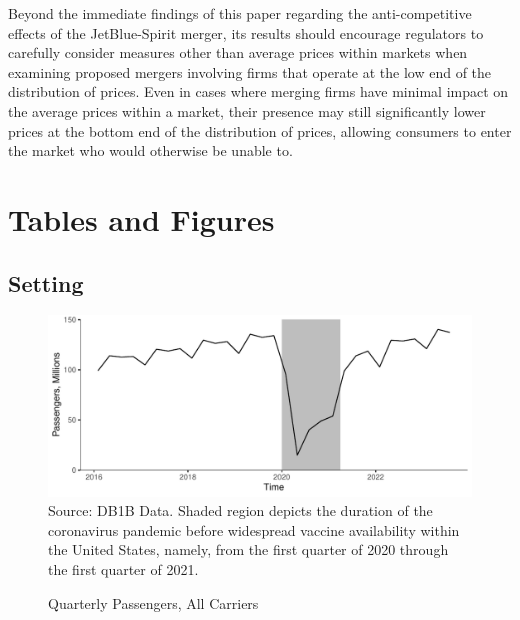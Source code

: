 \documentclass{article}
\begin{document}
    Beyond the immediate findings of this paper regarding the anti-competitive effects of the JetBlue-Spirit merger, its results should encourage regulators to carefully consider measures other than average prices within markets when examining proposed mergers involving firms that operate at the low end of the distribution of prices. Even in cases where merging firms have minimal impact on the average prices within a market, their presence may still significantly lower prices at the bottom end of the distribution of prices, allowing consumers to enter the market who would otherwise be unable to. 
    
	
	\pagebreak 
	 
	
	\FloatBarrier
	
\pagebreak 
\FloatBarrier
\section{Tables and Figures}
\subsection{Setting}
\begin{figure}
	\caption{Quarterly Passengers, All Carriers}
	\label{fig:QuarterlyPass}
	\includegraphics[width = \linewidth]{Quarterly_DB1B_Itineraries}
	\footnotesize{Source: DB1B Data. Shaded region depicts the duration of the coronavirus pandemic before widespread vaccine availability within the United States, namely, from the first quarter of 2020 through the first quarter of 2021.}
\end{figure}
\end{document}
